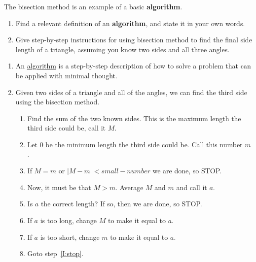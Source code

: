 \documentclass{ximera}
\begin{document}
\begin{question}
  The bisection method is an example of a basic \textbf{algorithm}.
  \begin{enumerate}
    \item Find a relevant definition of an \textbf{algorithm}, and state it in
      your own words.
    \item  Give step-by-step instructions for using bisection method to find
  the final side length of a triangle, assuming you know two sides and
  all three angles.
  \end{enumerate}
  \begin{freeResponse}
    \begin{enumerate}
    \item An \underline{algorithm} is a step-by-step description of how
      to solve a problem that can be applied with minimal thought.
    \item Given two sides of a triangle and all of the angles, we can
      find the third side using the bisection method.

    \begin{enumerate}
      \item Find the sum of the two known sides. This is the maximum
        length the third side could be, call it $M$.
      \item Let $0$ be the minimum length the third side could be. Call this number $m$.
      \item\label{I:stop} If $M=m$ or $|M-m|< small-number$ we are done, so STOP.
      \item Now, it must be that $M>m$. Average $M$ and $m$ and call it $a$.
      \item Is $a$ the correct length? If so, then we are done, so STOP.
      \item If $a$ is too long, change $M$ to make it equal to $a$.
      \item If $a$ is too short, change $m$ to make it equal to $a$.
      \item Goto step~\ref{I:stop}.
    \end{enumerate}
    \end{enumerate}
  \end{freeResponse}
\end{question}
\end{document}
